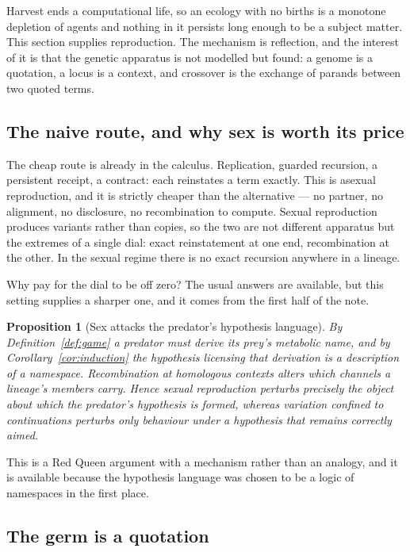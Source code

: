 \documentclass[11pt]{article}
\theoremstyle{plain}
\newtheorem{proposition}[theorem]{Proposition}
\theoremstyle{definition}
\begin{document}
Harvest ends a computational life, so an ecology with no births is a monotone depletion of agents and
nothing in it persists long enough to be a subject matter. This section supplies reproduction. The
mechanism is reflection, and the interest of it is that the genetic apparatus is not modelled but
found: a genome is a quotation, a locus is a context, and crossover is the exchange of parands between
two quoted terms.

\subsection{The naive route, and why sex is worth its price}

The cheap route is already in the calculus. Replication, guarded recursion, a persistent receipt, a
contract: each reinstates a term exactly. This is asexual reproduction, and it is strictly cheaper
than the alternative --- no partner, no alignment, no disclosure, no recombination to compute.
Sexual reproduction produces variants rather than copies, so the two are not different apparatus but
the extremes of a single dial: exact reinstatement at one end, recombination at the other. In the
sexual regime there is no exact recursion anywhere in a lineage.

Why pay for the dial to be off zero? The usual answers are available, but this setting supplies a
sharper one, and it comes from the first half of the note.

\begin{proposition}[Sex attacks the predator's hypothesis language]
\label{prop:sexdefence}
By Definition~\ref{def:game} a predator must \emph{derive} its prey's metabolic name, and by
Corollary~\ref{cor:induction} the hypothesis licensing that derivation is a description of a
namespace. Recombination at homologous contexts alters which channels a lineage's members carry.
Hence sexual reproduction perturbs precisely the object about which the predator's hypothesis is
formed, whereas variation confined to continuations perturbs only behaviour under a hypothesis that
remains correctly aimed.
\end{proposition}

This is a Red Queen argument with a mechanism rather than an analogy, and it is available because the
hypothesis language was chosen to be a logic of namespaces in the first place.

\subsection{The germ is a quotation}
\end{document}
